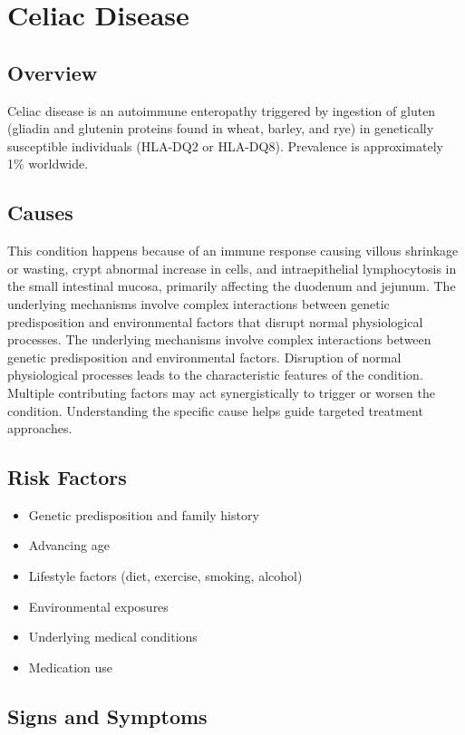\chapter{Celiac Disease}
\label{sec:Celiac Disease}

\section{Overview}
Celiac disease is an autoimmune enteropathy triggered by ingestion of gluten (gliadin and glutenin proteins found in wheat, barley, and rye) in genetically susceptible individuals (HLA-DQ2 or HLA-DQ8). Prevalence is approximately 1\% worldwide.
\section{Causes}
This condition happens because of an immune response causing villous shrinkage or wasting, crypt abnormal increase in cells, and intraepithelial lymphocytosis in the small intestinal mucosa, primarily affecting the duodenum and jejunum. The underlying mechanisms involve complex interactions between genetic predisposition and environmental factors that disrupt normal physiological processes. The underlying mechanisms involve complex interactions between genetic predisposition and environmental factors. Disruption of normal physiological processes leads to the characteristic features of the condition. Multiple contributing factors may act synergistically to trigger or worsen the condition. Understanding the specific cause helps guide targeted treatment approaches.
\section{Risk Factors}


\begin{itemize}[noitemsep]
  \item Genetic predisposition and family history
  \item Advancing age
  \item Lifestyle factors (diet, exercise, smoking, alcohol)
  \item Environmental exposures
  \item Underlying medical conditions
  \item Medication use
\end{itemize}
\section{Signs and Symptoms}

